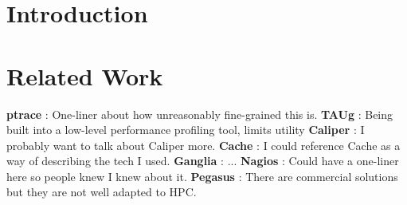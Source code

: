 
\section{Introduction}





\section{Related Work}



\textbf{ptrace} : One-liner about how unreasonably fine-grained this is.
\textbf{TAUg} : Being built into a low-level performance profiling tool, limits utility
\textbf{Caliper} : I probably want to talk about Caliper more.
\textbf{Cache} : I could reference Cache as a way of describing the tech I used.
\textbf{Ganglia} : ...
\textbf{Nagios} : Could have a one-liner here so people knew I knew about it.
\textbf{Pegasus} : There are commercial solutions but they are not well adapted to HPC.







